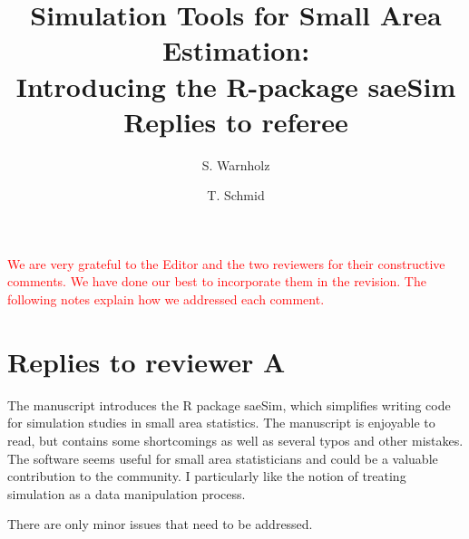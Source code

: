 \documentclass[11pt]{article}
\begin{document}
\title{{Simulation Tools for Small Area Estimation:\\
Introducing the R-package saeSim} \\Replies to referee}
\author{S. Warnholz
\and T. Schmid
}

\date{} \maketitle







\textcolor{red}{We are very grateful to the Editor and the two reviewers for their constructive comments. We have done our best to incorporate them in the revision. The following notes explain how we addressed each comment.}

\section*{Replies to reviewer A}

The manuscript introduces the R package saeSim, which simplifies writing code for simulation studies in small area statistics. The manuscript is enjoyable to read, but contains some shortcomings as well as several typos and other mistakes. The software seems useful for small area statisticians and could be a valuable contribution to the community. I particularly like the notion of treating simulation as a data manipulation process.

\vspace{0.5cm}

\noindent There are only minor issues that need to be addressed.
\end{document}
